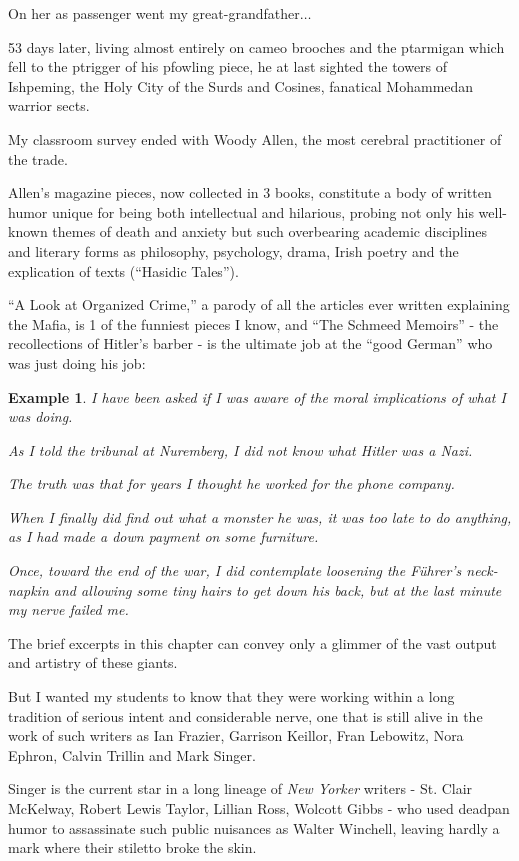 \documentclass{book}
\numberwithin{equation}{section}
\newtheorem{example}{Example}[chapter]
\begin{document}
On her as passenger went my great-grandfather$\ldots$

53 days later, living almost entirely on cameo brooches and the ptarmigan which fell to the ptrigger of his pfowling piece, he at last sighted the towers of Ishpeming, the Holy City of the Surds and Cosines, fanatical Mohammedan warrior sects.

My classroom survey ended with Woody Allen, the most cerebral practitioner of the trade.

Allen's magazine pieces, now collected in 3 books, constitute a body of written humor unique for being both intellectual and hilarious, probing not only his well-known themes of death and anxiety but such overbearing academic disciplines and literary forms as philosophy, psychology, drama, Irish poetry and the explication of texts (``Hasidic Tales'').

``A Look at Organized Crime,'' a parody of all the articles ever written explaining the Mafia, is 1 of the funniest pieces I know, and ``The Schmeed Memoirs'' - the recollections of Hitler's barber - is the ultimate job at the ``good German'' who was just doing his job:
\begin{example}
    I have been asked if I was aware of the moral implications of what I was doing.
    
    As I told the tribunal at Nuremberg, I did not know what Hitler was a Nazi.
    
    The truth was that for years I thought he worked for the phone company.
    
    When I finally did find out what a monster he was, it was too late to do anything, as I had made a down payment on some furniture.
    
    Once, toward the end of the war, I did contemplate loosening the F\"uhrer's neck-napkin and allowing some tiny hairs to get down his back, but at the last minute my nerve failed me.
\end{example}
The brief excerpts in this chapter can convey only a glimmer of the vast output and artistry of these giants.

But I wanted my students to know that they were working within a long tradition of serious intent and considerable nerve, one that is still alive in the work of such writers as Ian Frazier, Garrison Keillor, Fran Lebowitz, Nora Ephron, Calvin Trillin and Mark Singer.

Singer is the current star in a long lineage of \textit{New Yorker} writers - St. Clair McKelway, Robert Lewis Taylor, Lillian Ross, Wolcott Gibbs - who used deadpan humor to assassinate such public nuisances as Walter Winchell, leaving hardly a mark where their stiletto broke the skin.
\end{document}
